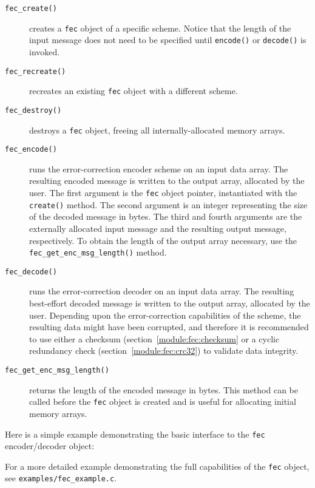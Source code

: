 
\begin{description}
\item[{\tt fec\_create()}]
    creates a {\tt fec} object of a specific scheme.
    Notice that the length of the input message does not need to be specified
    until {\tt encode()} or {\tt decode()} is invoked.
\item[{\tt fec\_recreate()}]
    recreates an existing {\tt fec} object with a different scheme.
\item[{\tt fec\_destroy()}]
    destroys a {\tt fec} object, freeing all internally-allocated memory
    arrays.
\item[{\tt fec\_encode()}]
    runs the error-correction encoder scheme on an input data array.
    The resulting encoded message is written to the output array, allocated by
    the user.
    The first argument is the {\tt fec} object pointer, instantiated with the
    {\tt create()} method.
    The second argument is an integer representing the size of the decoded
    message in bytes.
    The third and fourth arguments are the externally allocated input message
    and the resulting output message, respectively.
    To obtain the length of the output array necessary, use the
    {\tt fec\_get\_enc\_msg\_length()} method.
\item[{\tt fec\_decode()}]
    runs the error-correction decoder on an input data array.
    The resulting best-effort decoded message is written to the output array,
    allocated by the user.
    Depending upon the error-correction capabilities of the scheme, the
    resulting data might have been corrupted, and therefore it is recommended
    to use either a
    checksum (section~\ref{module:fec:checksum} or a
    cyclic redundancy check (section~\ref{module:fec:crc32})
    to validate data integrity.
\item[{\tt fec\_get\_enc\_msg\_length()}]
    returns the length of the encoded message in bytes.
    This method can be called before the {\tt fec} object is created and is
    useful for allocating initial memory arrays.
\end{description}

Here is a simple example demonstrating the basic interface to the {\tt fec}
encoder/decoder object:

For a more detailed example demonstrating the full capabilities of the
{\tt fec} object, see {\tt examples/fec\_example.c}.

